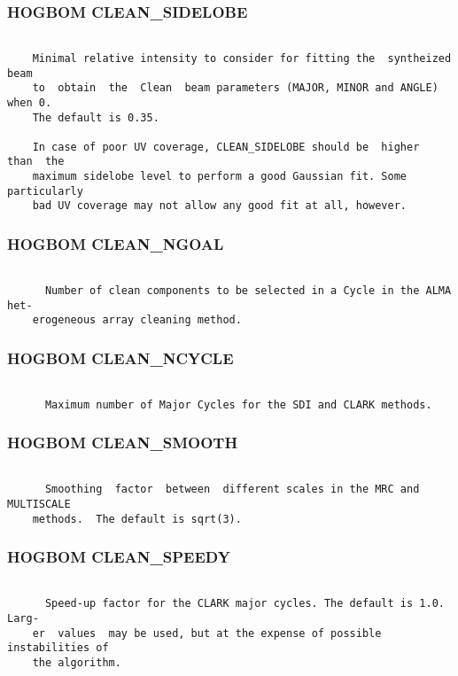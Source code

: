 \subsubsection{HOGBOM CLEAN\_SIDELOBE}
\begin{verbatim}

    Minimal relative intensity to consider for fitting the  syntheized  beam
    to  obtain  the  Clean  beam parameters (MAJOR, MINOR and ANGLE) when 0.
    The default is 0.35.

    In case of poor UV coverage, CLEAN_SIDELOBE should be  higher  than  the
    maximum sidelobe level to perform a good Gaussian fit. Some particularly
    bad UV coverage may not allow any good fit at all, however.

\end{verbatim}
\subsubsection{HOGBOM CLEAN\_NGOAL}
\begin{verbatim}

      Number of clean components to be selected in a Cycle in the ALMA  het-
    erogeneous array cleaning method.

\end{verbatim}
\subsubsection{HOGBOM CLEAN\_NCYCLE}
\begin{verbatim}

      Maximum number of Major Cycles for the SDI and CLARK methods.

\end{verbatim}
\subsubsection{HOGBOM CLEAN\_SMOOTH}
\begin{verbatim}

      Smoothing  factor  between  different scales in the MRC and MULTISCALE
    methods.  The default is sqrt(3).

\end{verbatim}
\subsubsection{HOGBOM CLEAN\_SPEEDY}
\begin{verbatim}

      Speed-up factor for the CLARK major cycles. The default is 1.0.  Larg-
    er  values  may be used, but at the expense of possible instabilities of
    the algorithm.

\end{verbatim}
